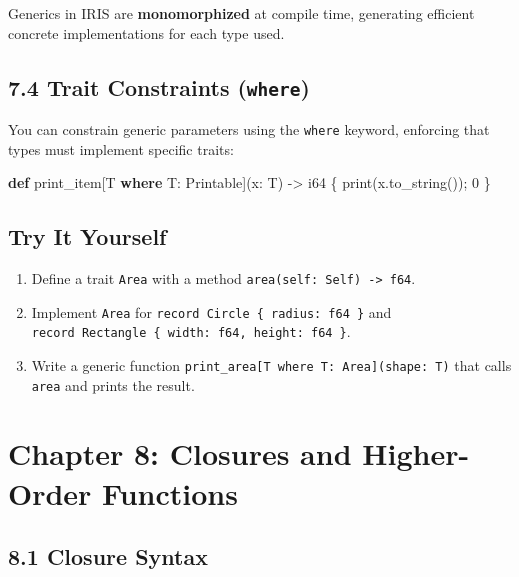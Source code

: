 \documentclass[
  english,
]{book}
\newenvironment{Shaded}{\begin{snugshade}}{\end{snugshade}}
\newcommand{\DataTypeTok}[1]{\textcolor[rgb]{0.31,0.79,0.69}{#1}}
\newcommand{\DecValTok}[1]{\textcolor[rgb]{0.71,0.81,0.66}{#1}}
\newcommand{\FunctionTok}[1]{\textcolor[rgb]{0.86,0.86,0.67}{#1}}
\newcommand{\KeywordTok}[1]{\textcolor[rgb]{0.34,0.61,0.84}{\textbf{#1}}}
\newcommand{\NormalTok}[1]{\textcolor[rgb]{0.83,0.83,0.83}{#1}}
\newcommand{\OperatorTok}[1]{\textcolor[rgb]{0.83,0.83,0.83}{#1}}
\providecommand{\tightlist}{%
  \setlength{\itemsep}{0pt}\setlength{\parskip}{0pt}}
\begin{document}
Generics in IRIS are \textbf{monomorphized} at compile time, generating
efficient concrete implementations for each type used.

\subsection{\texorpdfstring{7.4 Trait Constraints
(\texttt{where})}{7.4 Trait Constraints (where)}}\label{trait-constraints-where-1}

You can constrain generic parameters using the \texttt{where} keyword,
enforcing that types must implement specific traits:

\begin{Shaded}
\begin{Highlighting}[]
\KeywordTok{def}\NormalTok{ print\_item[T }\KeywordTok{where}\NormalTok{ T: Printable](x: T) }\OperatorTok{{-}\textgreater{}} \DataTypeTok{i64}\NormalTok{ \{}
    \FunctionTok{print}\NormalTok{(x}\OperatorTok{.}\NormalTok{to\_string());}
    \DecValTok{0}
\NormalTok{\}}
\end{Highlighting}
\end{Shaded}

\subsection{Try It Yourself}\label{try-it-yourself-6}

\begin{enumerate}
\def\labelenumi{\arabic{enumi}.}
\tightlist
\item
  Define a trait \texttt{Area} with a method
  \texttt{area(self:\ Self)\ -\textgreater{}\ f64}.
\item
  Implement \texttt{Area} for
  \texttt{record\ Circle\ \{\ radius:\ f64\ \}} and
  \texttt{record\ Rectangle\ \{\ width:\ f64,\ height:\ f64\ \}}.
\item
  Write a generic function
  \texttt{print\_area{[}T\ where\ T:\ Area{]}(shape:\ T)} that calls
  \texttt{area} and prints the result.
\end{enumerate}

\section{Chapter 8: Closures and Higher-Order
Functions}\label{chapter-8-closures-and-higher-order-functions}

\subsection{8.1 Closure Syntax}\label{closure-syntax}
\end{document}
